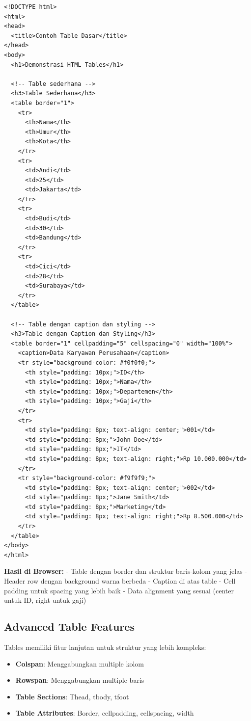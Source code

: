\begin{lstlisting}[caption={Contoh Basic Table}, basicstyle=\ttfamily\small, frame=single]
<!DOCTYPE html>
<html>
<head>
  <title>Contoh Table Dasar</title>
</head>
<body>
  <h1>Demonstrasi HTML Tables</h1>
  
  <!-- Table sederhana -->
  <h3>Table Sederhana</h3>
  <table border="1">
    <tr>
      <th>Nama</th>
      <th>Umur</th>
      <th>Kota</th>
    </tr>
    <tr>
      <td>Andi</td>
      <td>25</td>
      <td>Jakarta</td>
    </tr>
    <tr>
      <td>Budi</td>
      <td>30</td>
      <td>Bandung</td>
    </tr>
    <tr>
      <td>Cici</td>
      <td>28</td>
      <td>Surabaya</td>
    </tr>
  </table>
  
  <!-- Table dengan caption dan styling -->
  <h3>Table dengan Caption dan Styling</h3>
  <table border="1" cellpadding="5" cellspacing="0" width="100%">
    <caption>Data Karyawan Perusahaan</caption>
    <tr style="background-color: #f0f0f0;">
      <th style="padding: 10px;">ID</th>
      <th style="padding: 10px;">Nama</th>
      <th style="padding: 10px;">Departemen</th>
      <th style="padding: 10px;">Gaji</th>
    </tr>
    <tr>
      <td style="padding: 8px; text-align: center;">001</td>
      <td style="padding: 8px;">John Doe</td>
      <td style="padding: 8px;">IT</td>
      <td style="padding: 8px; text-align: right;">Rp 10.000.000</td>
    </tr>
    <tr style="background-color: #f9f9f9;">
      <td style="padding: 8px; text-align: center;">002</td>
      <td style="padding: 8px;">Jane Smith</td>
      <td style="padding: 8px;">Marketing</td>
      <td style="padding: 8px; text-align: right;">Rp 8.500.000</td>
    </tr>
  </table>
</body>
</html>
\end{lstlisting}

\textbf{Hasil di Browser:}
- Table dengan border dan struktur baris-kolom yang jelas
- Header row dengan background warna berbeda
- Caption di atas table
- Cell padding untuk spacing yang lebih baik
- Data alignment yang sesuai (center untuk ID, right untuk gaji)

\subsection{Advanced Table Features}

Tables memiliki fitur lanjutan untuk struktur yang lebih kompleks:

\begin{itemize}
  \item \textbf{Colspan}: Menggabungkan multiple kolom
  \item \textbf{Rowspan}: Menggabungkan multiple baris
  \item \textbf{Table Sections}: Thead, tbody, tfoot
  \item \textbf{Table Attributes}: Border, cellpadding, cellspacing, width
\end{itemize}

